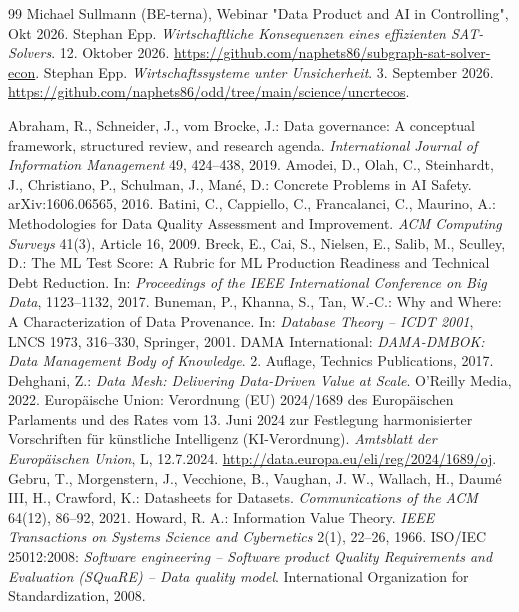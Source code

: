 \documentclass[a4paper,12pt]{article}
\theoremstyle{definition}
\begin{document}

\begin{thebibliography}{99}
 Michael Sullmann (BE-terna), Webinar "Data Product and AI in Controlling", Okt 2026.
 Stephan Epp. \emph{Wirtschaftliche Konsequenzen eines effizienten SAT-Solvers}. 12. Oktober 2026. \url{https://github.com/naphets86/subgraph-sat-solver-econ}.
 Stephan Epp. \emph{Wirtschaftssysteme unter Unsicherheit}. 3. September 2026. \url{https://github.com/naphets86/odd/tree/main/science/uncrtecos}.

 Abraham, R., Schneider, J., vom Brocke, J.: Data governance: A conceptual framework, structured review, and research agenda. \emph{International Journal of Information Management} 49, 424--438, 2019.
 Amodei, D., Olah, C., Steinhardt, J., Christiano, P., Schulman, J., Mané, D.: Concrete Problems in AI Safety. arXiv:1606.06565, 2016.
 Batini, C., Cappiello, C., Francalanci, C., Maurino, A.: Methodologies for Data Quality Assessment and Improvement. \emph{ACM Computing Surveys} 41(3), Article 16, 2009.
 Breck, E., Cai, S., Nielsen, E., Salib, M., Sculley, D.: The ML Test Score: A Rubric for ML Production Readiness and Technical Debt Reduction. In: \emph{Proceedings of the IEEE International Conference on Big Data}, 1123--1132, 2017.
 Buneman, P., Khanna, S., Tan, W.-C.: Why and Where: A Characterization of Data Provenance. In: \emph{Database Theory -- ICDT 2001}, LNCS 1973, 316--330, Springer, 2001.
 DAMA International: \emph{DAMA-DMBOK: Data Management Body of Knowledge}. 2. Auflage, Technics Publications, 2017.
 Dehghani, Z.: \emph{Data Mesh: Delivering Data-Driven Value at Scale}. O'Reilly Media, 2022.
 Europäische Union: Verordnung (EU) 2024/1689 des Europäischen Parlaments und des Rates vom 13. Juni 2024 zur Festlegung harmonisierter Vorschriften für künstliche Intelligenz (KI-Verordnung). \emph{Amtsblatt der Europäischen Union}, L, 12.7.2024. \url{http://data.europa.eu/eli/reg/2024/1689/oj}.
 Gebru, T., Morgenstern, J., Vecchione, B., Vaughan, J. W., Wallach, H., Daumé III, H., Crawford, K.: Datasheets for Datasets. \emph{Communications of the ACM} 64(12), 86--92, 2021.
 Howard, R. A.: Information Value Theory. \emph{IEEE Transactions on Systems Science and Cybernetics} 2(1), 22--26, 1966.
 ISO/IEC 25012:2008: \emph{Software engineering -- Software product Quality Requirements and Evaluation (SQuaRE) -- Data quality model}. International Organization for Standardization, 2008.

\end{thebibliography}
\end{document}

